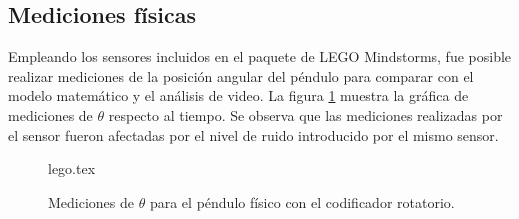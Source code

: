 \subsection{Mediciones físicas}

Empleando los sensores incluidos en el paquete de LEGO
Mindstorms, fue posible realizar mediciones de la 
posición angular del péndulo para comparar con el
modelo matemático y el análisis de video.
La figura \ref{fig: mindstorms theta} muestra la
gráfica de mediciones de $\theta$ respecto al tiempo.
Se observa que las mediciones realizadas por el sensor
fueron afectadas por el nivel de ruido introducido 
por el mismo sensor.

\begin{figure}[htb!]
 \centering
{lego.tex}
 \caption{Mediciones de $\theta$ para el péndulo físico con el codificador rotatorio.}
 \label{fig: mindstorms theta}
\end{figure}


\clearpage
